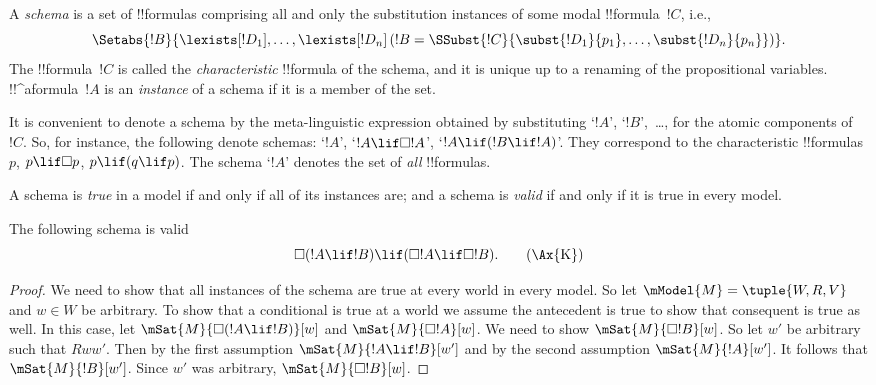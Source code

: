 \documentclass[../../../include/open-logic-section]{subfiles}
\begin{document}

\begin{defn}
  A \emph{schema} is a set of !!{formula}s comprising all
  and only the substitution instances of some modal !!{formula}~$!C$, i.e.,
  \[
  \Setabs{!B}{\lexists[!D_1], \dots, \lexists[!D_n] \left(!B =
  \SSubst{!C}{\subst{!D_1}{p_1}, \dots, \subst{!D_n}{p_n}} \right) }.
  \]
  The !!{formula}~$!C$ is called the \emph{characteristic} !!{formula} of
  the schema, and it is unique up to a renaming of the propositional
  variables. !!^a{formula}~$!A$ is an \emph{instance} of a schema if
  it is a member of the set.
\end{defn}

It is convenient to denote a schema by the meta-linguistic expression
obtained by substituting `$!A$', `$!B$',~\dots, for the atomic
components of~$!C$. So, for instance, the following denote schemas:
`$!A$', `$!A \lif \Box!A$', `$!A \lif (!B \lif !A)$'. They correspond
to the characteristic !!{formula}s $p$, $p \lif \Box p$, $p \lif (q
\lif p)$. The schema `$!A$' denotes the set of \emph{all}
!!{formula}s.

\begin{defn}
  A schema is \emph{true} in a model if and only if all of its instances
  are; and a schema is \emph{valid} if and only if it is true in every
  model.
\end{defn}

\begin{prop}
  The following schema  is valid
  \begin{equation*}
  \Box(!A \lif !B) \lif (\Box !A \lif \Box !B). \tag{\Ax{K}}
  \end{equation*}
\end{prop}

\begin{proof}
  We need to show that all instances of the schema are true at every
  world in every model. So let $\mModel{M} = \tuple{W,R,V}$ and $w \in
  W$ be arbitrary. To show that a conditional is true at a world we
  assume the antecedent is true to show that consequent is true as
  well. In this case, let $\mSat{M}{\Box(!A \lif !B)}[w]$ and
  $\mSat{M}{\Box !A}[w]$. We need to show $\mSat{M}{\Box !B}[w]$. So let
  $w'$ be arbitrary such that $Rww'$. Then by the first assumption
  $\mSat{M}{!A \lif !B}[w']$ and by the second assumption
  $\mSat{M}{!A}[w']$. It follows that $\mSat{M}{!B}[w']$. Since $w'$
  was arbitrary, $\mSat{M}{\Box !B}[w]$.
\end{proof}
\end{document}
